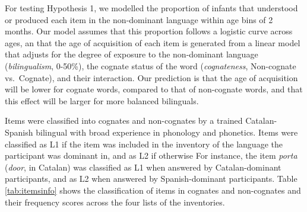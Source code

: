 \documentclass[
  english,
  man,man,floatsintext]{apa6}
\begin{document}
For testing Hypothesis 1, we modelled the proportion of infants that understood or produced each item in the non-dominant language within age bins of 2 months. Our model assumes that this proportion follows a logistic curve across ages, an that the age of acquisition of each item is generated from a linear model that adjusts for the degree of exposure to the non-dominant language (\emph{bilingualism}, 0-50\%), the cognate status of the word (\emph{cognateness}, Non-cognate vs.~Cognate), and their interaction. Our prediction is that the age of acquisition will be lower for cognate words, compared to that of non-cognate words, and that this effect will be larger for more balanced bilinguals.

Items were classified into cognates and non-cognates by a trained Catalan-Spanish bilingual with broad experience in phonology and phonetics. Items were classified as L1 if the item was included in the inventory of the language the participant was dominant in, and as L2 if otherwise For instance, the item \emph{porta} (\emph{door}, in Catalan) was classified as L1 when answered by Catalan-dominant participants, and as L2 when answered by Spanish-dominant participants. Table \ref{tab:itemsinfo} shows the classification of items in cognates and non-cognates and their frequency scores across the four lists of the inventories.
\end{document}
